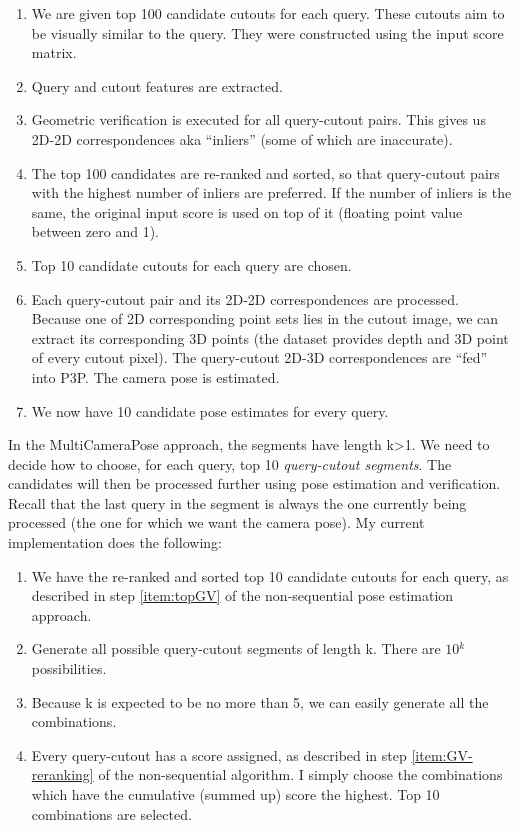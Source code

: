 \documentclass[twoside]{ctuthesis}
\theoremstyle{plain}
\theoremstyle{definition}
\theoremstyle{note}
\newcommand{\topRetrieval}{100} %
\newcommand{\topGV}{10} %
\newcommand{\topPE}{10} %
\begin{document}
\begin{enumerate}
	\item We are given top \topRetrieval{} candidate cutouts for each query. These cutouts aim to be visually similar to the query. They were constructed using the input score matrix.
	\item Query and cutout features are extracted.
	\item Geometric verification is executed for all query-cutout pairs. This gives us 2D-2D correspondences aka ``inliers'' (some of which are inaccurate).
	\item \label{item:GV-reranking} The top \topRetrieval{} candidates are re-ranked and sorted, so that query-cutout pairs with the highest number of inliers are preferred. If the number of inliers is the same, the original input score is used on top of it (floating point value between zero and 1).
	\item \label{item:topGV} Top \topGV{} candidate cutouts for each query are chosen.
	\item Each query-cutout pair and its 2D-2D correspondences are processed. Because one of 2D corresponding point sets lies in the cutout image, we can extract its corresponding 3D points (the dataset provides depth and 3D point of every cutout pixel). The query-cutout 2D-3D correspondences are ``fed'' into P3P. The camera pose is estimated.
	\item We now have \topPE{} candidate pose estimates for every query.
\end{enumerate}

In the MultiCameraPose approach, the segments have length k>1. We need to decide how to choose, for each query, top \topPE{} \emph{query-cutout segments}. The candidates will then be processed further using pose estimation and verification. Recall that the last query in the segment is always the one currently being processed (the one for which we want the camera pose). My current implementation does the following:

\begin{enumerate}
	\item We have the re-ranked and sorted top \topGV{} candidate cutouts for each query, as described in step \ref{item:topGV} of the non-sequential pose estimation approach.
	\item Generate all possible query-cutout segments of length k. There are $\topGV{}^{k}$ possibilities.
	\item Because k is expected to be no more than 5, we can easily generate all the combinations.
	\item \label{item:topGV-sequential} Every query-cutout has a score assigned, as described in step \ref{item:GV-reranking} of the non-sequential algorithm. I simply choose the combinations which have the cumulative (summed up) score the highest. Top \topPE{} combinations are selected.
\end{enumerate}
\end{document}
